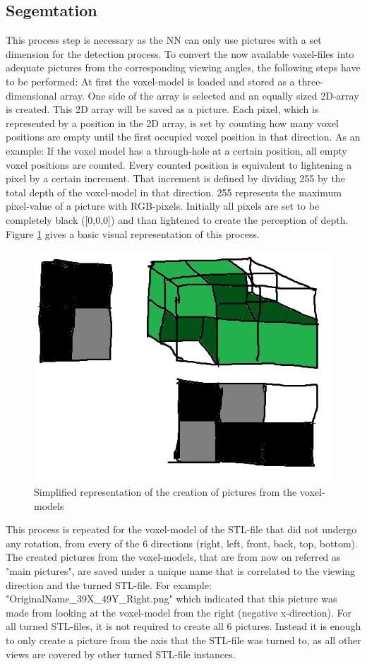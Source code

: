 \documentclass[conference]{IEEEtran}
\begin{document}
\subsection{Segemtation}
This process step is necessary as the NN can only use pictures with a set dimension for the detection process. 
To convert the now available voxel-files into adequate pictures from the corresponding viewing angles, the following steps have to be performed: At first the voxel-model is loaded and stored as a three-dimensional array. One side of the array is selected and an equally sized 2D-array is created. This 2D array will be saved as a picture. Each pixel, which is represented by a position in the 2D array, is set by counting how many voxel positions are empty until the first occupied voxel position in that direction. As an example: If the voxel model has a through-hole at a certain position, all empty voxel positions are counted. Every counted position is equivalent to lightening a pixel by a certain increment. That increment is defined by dividing 255 by the total depth of the voxel-model in that direction. 255 represents the maximum pixel-value of a picture with RGB-pixels. Initially all pixels are set to be completely black ([0,0,0]) and than lightened to create the perception of depth. Figure \ref{fig:HD_pic} gives a basic visual representation of this process.
\begin{figure}
	\begin{center}
		\includegraphics[width=0.7\linewidth]{pictures/HD_Picture_Process.png}
		\caption{Simplified representation of the creation of pictures from the voxel-models }
		\label{fig:HD_pic}
	\end{center}
\end{figure}
This process is repeated for the voxel-model of the STL-file that did not undergo any rotation, from every of the 6 directions (right, left, front, back, top, bottom).
The created pictures from the voxel-models, that are from now on referred as "main pictures", are saved under a unique name that is correlated to the viewing direction and the turned STL-file. For example: "OriginalName\_39X\_49Y\_Right.png" which indicated that this picture was made from looking at the voxel-model from the right (negative x-direction).
For all turned STL-files, it is not required to create all 6 pictures. Instead it is enough to only create a picture from the axis that the STL-file was turned to, as all other views are covered by other turned STL-file instances. 
\end{document}
